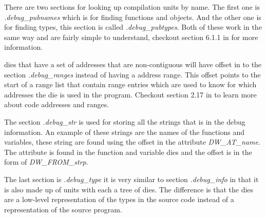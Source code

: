 There are two sections for looking up compilation units by name.
The first one is \emph{.debug\_pubnames} which is for finding functions and objects.
And the other one is for finding types, this section is called \emph{.debug\_pubtypes}.
Both of these work in the same way and are fairly simple to understand, checkout section 6.1.1 in \cite{dwarf} for more information.


\Glspl{die} that have a set of addresses that are non-contiguous will have offset in to the section \emph{.debug\_ranges} instead of having a address range.
This offset points to the start of a range list that contain range entries which are used to know for which addresses the \gls{die} is used in the program.
Checkout section 2.17 in \cite{dwarf} to learn more about code addresses and ranges.


The section \emph{.debug\_str} is used for storing all the strings that is in the debug information.
An example of these strings are the names of the functions and variables, these string are found using the offset in the attribute \emph{DW\_AT\_name}.
The attribute is found in the function and variable dies and the offset is in the form of \emph{DW\_FROM\_strp}.


The last section is \emph{.debug\_type} it is very similar to section \emph{.debug\_info} in that it is also made up of units with each a \gls{tree} of \glspl{die}.
The difference is that the \glspl{die} are a low-level representation of the types in the source code instead of a representation of the source program.

